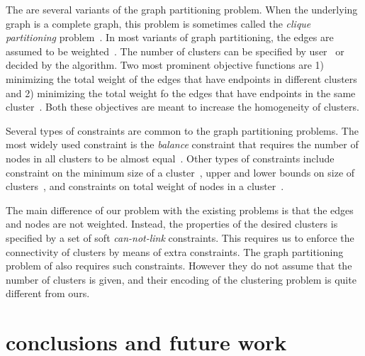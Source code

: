 \documentclass[conference,compsoc]{IEEEtran}
\begin{document}
The are several variants of the graph partitioning problem. When the underlying graph is a complete graph, this problem is sometimes called the \emph{clique partitioning} problem~\cite{REF}. In most variants of graph partitioning, the edges are assumed to be weighted~\cite{REF}. The number of clusters can be specified by user~\cite{REF} or decided by the algorithm. Two most prominent objective functions are 1) minimizing the total weight of the edges that have endpoints in different clusters~\cite{REF} and 2) minimizing the total weight fo the edges that have endpoints in the same cluster~\cite{REF}. Both these objectives are meant to increase the homogeneity of clusters.  

Several types of constraints are common to the graph partitioning problems. The most widely used constraint is the \emph{balance} constraint that requires the number of nodes in all clusters to be almost equal~\cite{REF}. Other types of constraints include constraint on the minimum size of a cluster~\cite{REF}, upper and lower bounds on size of clusters~\cite{REF}, and constraints on total weight of nodes in a cluster~\cite{REF}. 

The main difference of our problem with the existing problems is that the edges and nodes are not weighted. Instead, the properties of the desired clusters is specified by a set of soft \emph{can-not-link} constraints. This requires us to enforce the connectivity of clusters by means of extra constraints. The graph partitioning problem of \cite{connected} also requires such constraints. However they do not assume that the number of clusters is given, and their encoding of the clustering problem is quite different from ours. 


\section{conclusions and future work}
\label{sec:conclusion}



\end{document}

